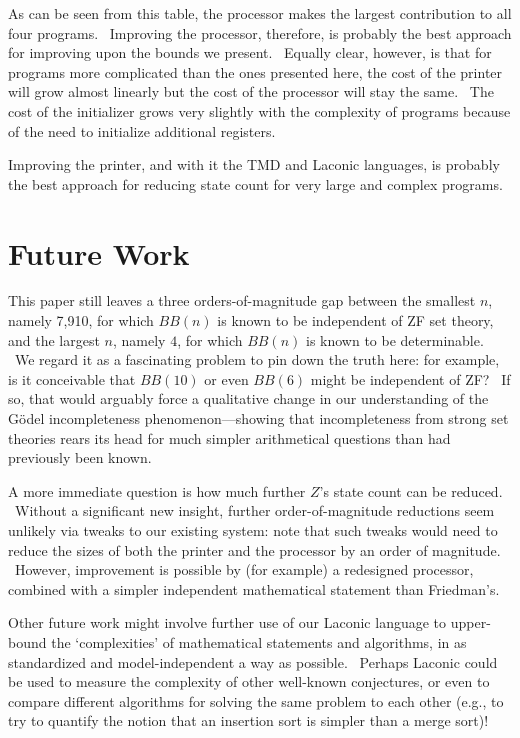 \documentclass[11pt]{article}
\newcommand{\statenumcomma}{7,910, }
\begin{document}
As can be seen from this table, the processor makes the largest contribution to all four programs. \ Improving the processor, therefore, is probably the best approach for improving upon the bounds we present. \ Equally clear, however, is that for programs more complicated than the ones presented here, the cost of the printer will grow almost linearly but the cost of the processor will stay the same. \ The cost of the initializer grows very slightly with the complexity of programs because of the need to initialize additional registers.

Improving the printer, and with it the TMD and Laconic languages, is probably the best approach for reducing state count for very large and complex programs.

\section{Future Work}

This paper still leaves a three orders-of-magnitude gap between the smallest $n$, namely \statenumcomma for which $BB(n)$ is known to be independent of ZF set theory, and the largest $n$, namely $4$, for which $BB(n)$ is known to be determinable. \ We regard it as a fascinating problem to pin down the truth here: for example, is it conceivable that $BB(10)$ or even $BB(6)$ might be independent of ZF? \ If so, that would arguably force a qualitative change in our understanding of the G\"{o}del incompleteness phenomenon---showing that incompleteness from strong set theories rears its head for much simpler arithmetical questions than had previously been known.

A more immediate question is how much further $Z$'s state count can be reduced. \ Without a significant new insight, further order-of-magnitude reductions seem unlikely via tweaks to our existing system: note that such tweaks would need to reduce the sizes of both the printer and the processor by an order of magnitude. \ However, improvement is possible by (for example) a redesigned processor, combined with a simpler independent mathematical statement than Friedman's.

Other future work might involve further use of our Laconic language to upper-bound the `complexities' of mathematical statements and algorithms, in as standardized and model-independent a way as possible. \ Perhaps Laconic could be used to measure the complexity of other well-known conjectures, or even to compare different algorithms for solving the same problem to each other (e.g., to try to quantify the notion that an insertion sort is simpler than a merge sort)!
\end{document}
